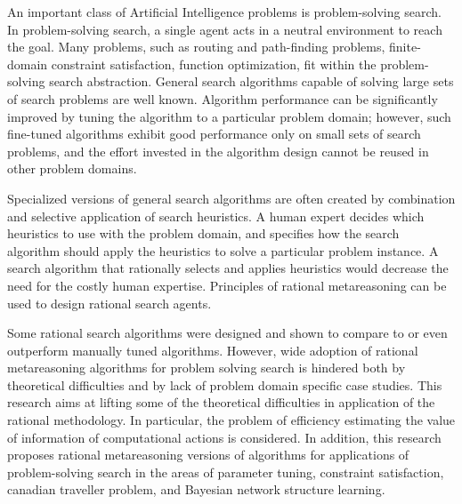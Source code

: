 An important class of Artificial Intelligence problems is
problem-solving search. In problem-solving search, a single agent acts
in a neutral environment to reach the goal. Many problems, such as
routing and path-finding problems, finite-domain constraint
satisfaction, function optimization, fit within the problem-solving
search abstraction. General search algorithms capable of solving large
sets of search problems are well known. Algorithm performance can be
significantly improved by tuning the algorithm to a particular problem
domain; however, such fine-tuned algorithms exhibit good performance
only on small sets of search problems, and the effort invested in the
algorithm design cannot be reused in other problem domains.

Specialized versions of general search algorithms are often created by
combination and selective application of search  heuristics.
A human expert decides which heuristics to use with the
problem domain, and specifies how the search algorithm should apply
the heuristics to solve a particular problem instance. A search
algorithm that rationally selects and applies heuristics would decrease
the need for the costly human expertise. Principles of rational
metareasoning can be used to design rational
search agents.

Some rational search algorithms were designed and shown to compare to
or even outperform manually tuned algorithms. However, wide adoption
of rational metareasoning algorithms for problem solving search is
hindered both by theoretical difficulties and by lack of problem
domain specific case studies. This research aims at lifting some of
the theoretical difficulties in application of the rational
methodology. In particular, the problem of efficiency estimating
the value of information of computational actions is considered. In
addition, this research proposes rational metareasoning versions of
algorithms for applications of problem-solving search in the areas of
parameter tuning, constraint satisfaction, canadian traveller problem,
and Bayesian network structure learning.
